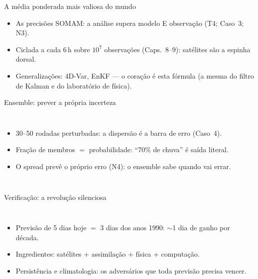 \documentclass[aspectratio=169,11pt]{beamer}
\begin{document}
\begin{frame}{A média ponderada mais valiosa do mundo}
  \vspace{0.5em}
  \begin{itemize}
    \item As precisões SOMAM: a análise supera modelo E observação
          (T4; Caso~3; N3).
    \item Ciclada a cada 6\,h sobre $10^7$ observações (Caps.~8--9):
          satélites são a espinha dorsal.
    \item Generalizações: 4D-Var, EnKF — o coração é esta fórmula (a
          mesma do filtro de Kalman e do laboratório de física).
  \end{itemize}
\end{frame}

\begin{frame}{Ensemble: prever a própria incerteza}
  \begin{columns}
    \begin{itemize}
      \item 30--50 rodadas perturbadas: a dispersão é a barra de
            erro (Caso~4).
      \item Fração de membros $=$ probabilidade: ``70\% de chuva'' é
            saída literal.
      \item O spread prevê o próprio erro (N4): o ensemble sabe
            quando vai errar.
    \end{itemize}
  \end{columns}
\end{frame}

\begin{frame}{Verificação: a revolução silenciosa}
  \begin{columns}
    \begin{itemize}
      \item Previsão de 5 dias hoje $=$ 3 dias dos anos 1990:
            $\sim$1 dia de ganho por década.
      \item Ingredientes: satélites $+$ assimilação $+$ física $+$
            computação.
      \item Persistência e climatologia: os adversários que toda
            previsão precisa vencer.
    \end{itemize}
  \end{columns}
\end{frame}
\end{document}
